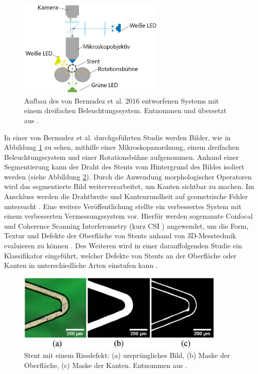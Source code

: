 \begin{figure}[h!]
\centering
\includegraphics[width=7cm]{98_images/aufbau_bermudez.png}
\caption{Aufbau des von Bermudez et al. 2016 entworfenen Systems mit einem dreifachen Beleuchtungssystem. Entnommen und übersetzt aus \cite{bermudez2017stent}.}
\label{fig:bermudez_aufbau}
\end{figure}

\mypar In einer von Bermudez et al. \cite{bermudez2017stent} durchgeführten Studie werden Bilder, wie in Abbildung \ref{fig:bermudez_aufbau} zu sehen, mithilfe einer Mikroskopanordnung, einem dreifachen Beleuchtungssystem und einer Rotationsbühne aufgenommen. Anhand einer Segmentierung kann der Draht des Stents vom Hintergrund des Bildes isoliert werden (siehe Abbildung \ref{fig:bermudez_stent_mask}). Durch die Anwendung morphologischer Operatoren wird das segmentierte Bild weiterverarbeitet, um Kanten sichtbar zu machen. Im Anschluss werden die Drahtbreite und Kantenrundheit auf geometrische Fehler untersucht \cite{bermudez2017stent}. Eine weitere Veröffentlichung stellte ein verbessertes System mit einem verbesserten Vermessungssystem vor. Hierfür werden sogenannte Confocal und Coherence Scanning Interferometry (kurz CSI \cite{de2011coherence}) angewendet, um die Form, Textur und Defekte der Oberfläche von Stents anhand von 3D-Messtechnik evaluieren zu können \cite{bermudez2017optical}. Des Weiteren wird in einer darauffolgenden Studie ein Klassifikator eingeführt, welcher Defekte von Stents an der Oberfläche oder Kanten in unterschiedliche Arten einstufen kann \cite{bermudez2017automated}.

\begin{figure}[h!]
\centering
\includegraphics[width=10cm]{98_images/stent_edge_mask.png}
\caption{Stent mit einem Rissdefekt: (a) ursprüngliches Bild, (b) Maske der Oberfläche, (c) Maske der Kanten. Entnommen aus \cite{bermudez2017stent}.}
\label{fig:bermudez_stent_mask}
\end{figure}


